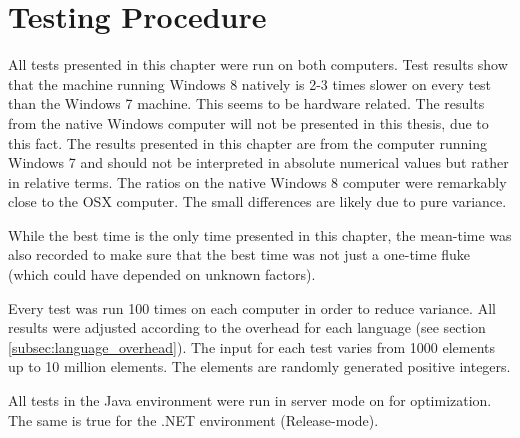 \section{Testing Procedure}
All tests presented in this chapter were run on both computers. Test results show that the machine running Windows 8 natively is 2-3 times slower on every test than the Windows 7 machine. This seems to be hardware related. The results from the native Windows computer will not be presented in this thesis, due to this fact. The results presented in this chapter are from the computer running Windows 7 and should not be interpreted in absolute numerical values but rather in relative terms. The ratios on the native Windows 8 computer were remarkably close to the OSX computer. The small differences are likely due to pure variance.

While the best time is the only time presented in this chapter, the mean-time was also recorded to make sure that the best time was not just a one-time fluke (which could have depended on unknown factors).

Every test was run 100 times on each computer in order to reduce variance. All results were adjusted according to the overhead for each language (see section \ref{subsec:language_overhead}). The input for each test varies from 1000 elements up to 10 million elements. The elements are randomly generated positive integers.

All tests in the Java environment were run in server mode on for optimization. The same is true for the .NET environment (Release-mode).
